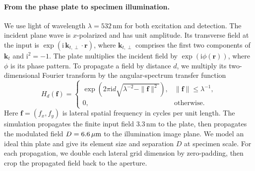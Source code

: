 \paragraph{From the phase plate to specimen illumination.}
We use light of wavelength $\lambda=532$\,nm for both excitation and detection. The incident plane wave is $x$-polarized and has unit amplitude. Its transverse field at the input is $\exp(\mathrm i\,\mathbf k_{t,\perp}\cdot\mathbf r)$, where $\mathbf k_{t,\perp}$ comprises the first two components of $\mathbf k_t$ and $\mathrm i^2=-1$. The plate multiplies the incident field by $\exp(\mathrm i\phi(\mathbf r))$, where $\phi$ is its phase pattern. To propagate a field by distance $d$, we multiply its two-dimensional Fourier transform by the angular-spectrum transfer function
\begin{equation}
H_d(\mathbf f)=
\begin{cases}
\exp\!\left(2\pi\mathrm i d\sqrt{\lambda^{-2}-\|\mathbf f\|^2}\right),
 &\|\mathbf f\|\leq\lambda^{-1},\\
0,&\text{otherwise}.
\end{cases}
\end{equation}
Here $\mathbf f=(f_x,f_y)$ is lateral spatial frequency in cycles per unit length. The simulation propagates the finite input field $3.3$\,nm to the plate, then propagates the modulated field $D=6.6\,\mu\mathrm{m}$ to the illumination image plane. We model an ideal thin plate and give its element size and separation $D$ at specimen scale. For each propagation, we double each lateral grid dimension by zero-padding, then crop the propagated field back to the aperture.

